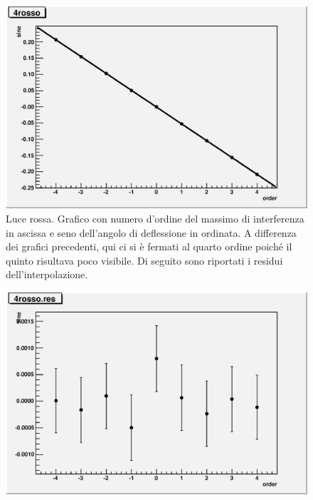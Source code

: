 \documentclass[italian,a4paper]{article}
\begin{document}
\begin{figure}[!h]\centering
\includegraphics[width=\textwidth]{4rosso.eps}
\caption{Luce rossa. Grafico con numero d'ordine del massimo di interferenza in ascissa e seno dell'angolo di deflessione in ordinata. A differenza dei grafici precedenti, qui ci si è fermati al quarto ordine poiché il quinto risultava poco visibile. Di seguito sono riportati i residui dell'interpolazione.}\label{rosso}
\end{figure}
\begin{figure}[!h]\centering
\includegraphics[width=\textwidth]{4rosso.res.eps}
\end{figure}
\end{document}
